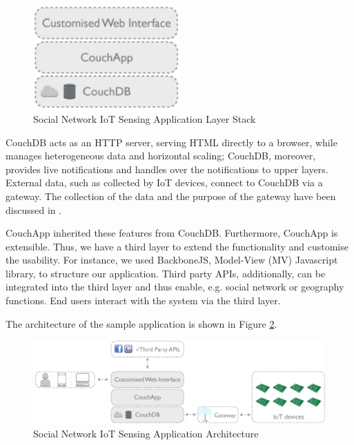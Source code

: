 \begin{figure}[ht]
  \begin{center}
    \includegraphics[width=0.5\textwidth]{images/data-centre-app-stack.pdf}
    \caption{Social Network IoT Sensing Application Layer Stack}
    \label{fig:data-centre-app-stack}
  \end{center}
\end{figure}

CouchDB acts as an HTTP server, serving HTML directly to a browser, while manages heterogeneous data and horizontal scaling; CouchDB, moreover, provides live notifications and handles over the notifications to upper layers. External data, such as collected by IoT devices, connect to CouchDB via a gateway. The collection of the data and the purpose of the gateway have been discussed in \cite{francesco2012storage}. 

CouchApp inherited these features from CouchDB. Furthermore, CouchApp is extensible. Thus, we have a third layer to extend the functionality and customise the usability. For instance, we used BackboneJS, Model-View (MV) Javascript library, to structure our application. Third party APIs, additionally, can be integrated into the third layer and thus enable, e.g. social network or geography functions. End users interact with the system via the third layer. 

The architecture of the sample application is shown in Figure \ref{fig:data-centre-architecture}.

\begin{figure}[ht]
  \begin{center}
    \includegraphics[width=1\textwidth]{images/data-centre-architecture.pdf}
    \caption{Social Network IoT Sensing Application Architecture \cite{francesco2012storage}}
    \label{fig:data-centre-architecture}
  \end{center}
\end{figure}

